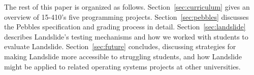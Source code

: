 
The rest of this paper is organized as follows.
Section~\ref{sec:curriculum} gives an overview of 15-410's five programming projects.
Section~\ref{sec:pebbles} discusses the Pebbles specification and grading process in detail.
Section~\ref{sec:landslide} describes Landslide's testing mechanisms and how we worked with students to evaluate Landslide.
Section~\ref{sec:future} concludes, discussing strategies for making Landslide more accessible to struggling students, and how Landslide might be applied to related operating systems projects at other universities.
